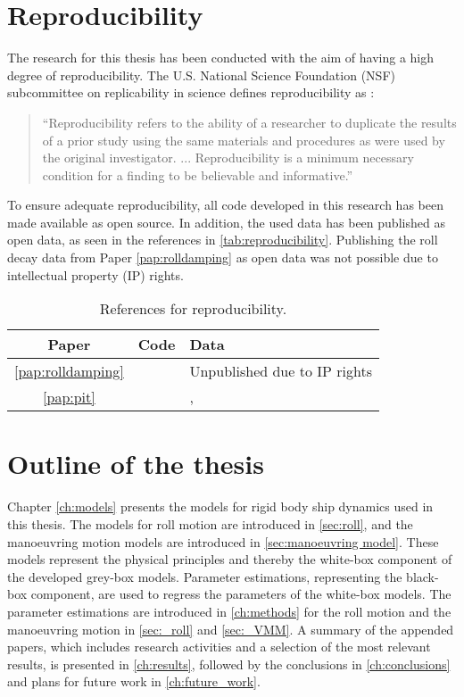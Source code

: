 \section{Reproducibility}
The research for this thesis has been conducted with the aim of having a high degree of reproducibility. The U.S. National Science Foundation (NSF) subcommittee on replicability in science defines reproducibility as \cite{bollen_social_2015}:
\begin{quote}
\vspace{0.2cm}
``Reproducibility refers to the ability of a researcher to duplicate the results of a prior study using the same materials and procedures as were used by the original investigator. ...  Reproducibility is a minimum necessary condition for a finding to be believable and informative.''
\vspace{0.2cm}
\end{quote}
To ensure adequate reproducibility, all code developed in this research has been made available as open source. In addition, the used data has been published as open data, as seen in the references in \autoref{tab:reproducibility}. Publishing the roll decay data from Paper \ref{pap:rolldamping} as open data was not possible due to intellectual property (IP) rights.

\begin{table}[H]
    \centering
    \caption{References for reproducibility.}
    \label{tab:reproducibility}
    \begin{tabular}{ c l l}
        \toprule
         Paper &  Code & Data \\
         \hline
         \ref{pap:rolldamping} & \textcite{alexandersson_rolldecay-estimators_2022} & Unpublished due to IP rights\\
         \ref{pap:pit} & \textcite{alexandersson_code_2022} & \textcite{alexandersson_wpcc_2022}, \textcite{stern_experience_2011} \\
         \bottomrule
    \end{tabular}
\end{table}

\section{Outline of the thesis}
Chapter \ref{ch:models} presents the models for rigid body ship dynamics used in this thesis. The models for roll motion are introduced in \autoref{sec:roll}, and the manoeuvring motion models are introduced in  \autoref{sec:manoeuvring model}. These models represent the physical principles and thereby the white-box component of the developed grey-box models.
Parameter estimations, representing the black-box component, are used to regress the parameters of the white-box models. The parameter estimations are introduced in \autoref{ch:methods} for the roll motion and the manoeuvring motion in \autoref{sec:_roll} and \autoref{sec:_VMM}. 
A summary of the appended papers, which includes research activities and a selection of the most relevant results, is presented in \autoref{ch:results}, followed by the conclusions in \autoref{ch:conclusions} and plans for future work in \autoref{ch:future_work}.
